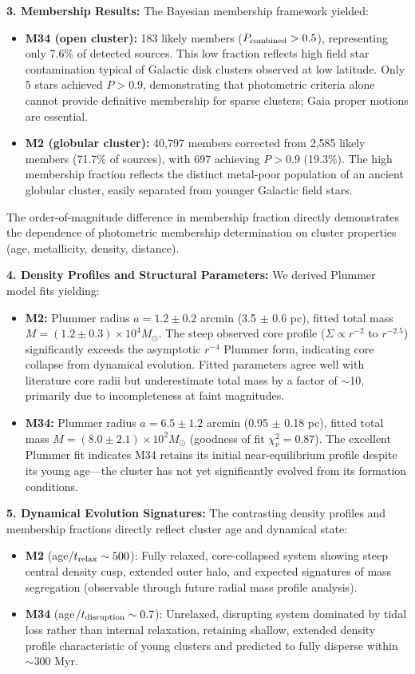 \documentclass[linenumbers,trackchanges,twocolumn]{aastex701}
\begin{document}
\textbf{3. Membership Results:} The Bayesian membership framework yielded:
\begin{itemize}
\item \textbf{M34 (open cluster):} 183 likely members ($P_{\rm combined} > 0.5$), representing only 7.6\% of detected sources. This low fraction reflects high field star contamination typical of Galactic disk clusters observed at low latitude. Only 5 stars achieved $P > 0.9$, demonstrating that photometric criteria alone cannot provide definitive membership for sparse clusters; Gaia proper motions are essential.
\item \textbf{M2 (globular cluster):} 40,797 members corrected from 2,585 likely members (71.7\% of sources), with 697 achieving $P > 0.9$ (19.3\%). The high membership fraction reflects the distinct metal-poor population of an ancient globular cluster, easily separated from younger Galactic field stars.
\end{itemize}

The order-of-magnitude difference in membership fraction directly demonstrates the dependence of photometric membership determination on cluster properties (age, metallicity, density, distance).

\textbf{4. Density Profiles and Structural Parameters:} We derived Plummer model fits yielding:
\begin{itemize}
\item \textbf{M2:} Plummer radius $a = 1.2 \pm 0.2$ arcmin (3.5 $\pm$ 0.6 pc), fitted total mass $M = (1.2 \pm 0.3) \times 10^4 M_\odot$. The steep observed core profile ($\Sigma \propto r^{-2}$ to $r^{-2.5}$) significantly exceeds the asymptotic $r^{-4}$ Plummer form, indicating core collapse from dynamical evolution. Fitted parameters agree well with literature core radii but underestimate total mass by a factor of $\sim$10, primarily due to incompleteness at faint magnitudes.
\item \textbf{M34:} Plummer radius $a = 6.5 \pm 1.2$ arcmin (0.95 $\pm$ 0.18 pc), fitted total mass $M = (8.0 \pm 2.1) \times 10^2 M_\odot$ (goodness of fit $\chi^2_\nu = 0.87$). The excellent Plummer fit indicates M34 retains its initial near-equilibrium profile despite its young age---the cluster has not yet significantly evolved from its formation conditions.
\end{itemize}

\textbf{5. Dynamical Evolution Signatures:} The contrasting density profiles and membership fractions directly reflect cluster age and dynamical state:
\begin{itemize}
\item \textbf{M2} (age$/ t_{\rm relax} \sim 500$): Fully relaxed, core-collapsed system showing steep central density cusp, extended outer halo, and expected signatures of mass segregation (observable through future radial mass profile analysis).
\item \textbf{M34} (age$/ t_{\rm disruption} \sim 0.7$): Unrelaxed, disrupting system dominated by tidal loss rather than internal relaxation, retaining shallow, extended density profile characteristic of young clusters and predicted to fully disperse within $\sim$300 Myr.
\end{itemize}
\end{document}
